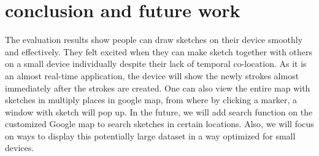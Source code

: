\documentclass{chi2009}
\begin{document}
\section{conclusion and future work}
The evaluation results show people can draw sketches on their device smoothly and effectively. They felt excited when they can make sketch together with others on a small device individually despite their lack of temporal co-location. As it is an almost real-time application, the device will show the newly strokes almost immediately after the strokes are created. One can also view the entire map with sketches in multiply places in google map, from where by clicking a marker, a window with sketch will pop up. In the future, we will add search function on the customized Google map to search sketches in certain locations. Also, we will focus on ways to display this potentially large dataset in a way optimized for small devices.




\end{document}
